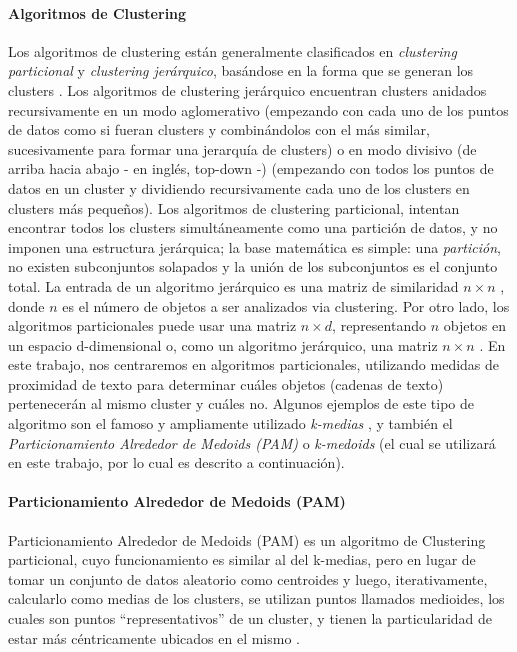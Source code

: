 \paragraph{Algoritmos de Clustering}
Los algoritmos de clustering están generalmente clasificados en \textit{clustering particional} y \textit{clustering jerárquico}, basándose en la forma que se generan los clusters \citep{xu2008clustering}. Los algoritmos de clustering jerárquico encuentran clusters anidados recursivamente en un modo aglomerativo (empezando con cada uno de los puntos de datos como si fueran clusters y combinándolos con el más similar, sucesivamente para formar una jerarquía de clusters) o en modo divisivo (de arriba hacia abajo - en inglés, top-down -) (empezando con todos los puntos de datos en un cluster y dividiendo recursivamente cada uno de los clusters en clusters más pequeños). Los algoritmos de clustering particional, intentan encontrar todos los clusters simultáneamente como una partición de datos, y no imponen una estructura jerárquica; la base matemática es simple: una \textit{partición}, no existen subconjuntos solapados y la unión de los subconjuntos es el conjunto total. La entrada de un algoritmo jerárquico es una matriz de similaridad \(n \times n\) , donde \(n\) es el número de objetos a ser analizados via clustering. Por otro lado, los algoritmos particionales puede usar una matriz \(n \times d\), representando \(n\) objetos en un espacio d-dimensional o, como un algoritmo jerárquico, una matriz \(n \times n\) \citep{jain2010data}.
En este trabajo, nos centraremos en algoritmos particionales, utilizando medidas de proximidad de texto para determinar cuáles objetos (cadenas de texto) pertenecerán al mismo cluster y cuáles no. Algunos ejemplos de este tipo de algoritmo son el famoso y ampliamente utilizado \textit{k-medias} \citep{macqueen1967some}, y también el \textit{Particionamiento Alrededor de Medoids (PAM)} o \textit{k-medoids} (el cual se utilizará en este trabajo, por lo cual es descrito a continuación).

\paragraph{Particionamiento Alrededor de Medoids (PAM)}
Particionamiento Alrededor de Medoids (PAM) es un algoritmo de Clustering particional, cuyo funcionamiento es similar al del k-medias, pero en lugar de tomar un conjunto de datos aleatorio como centroides y luego, iterativamente, calcularlo como medias de los clusters, se utilizan puntos llamados medioides, los cuales son puntos “representativos” de un cluster, y tienen la particularidad de estar más céntricamente ubicados en el mismo \citep{rdusseeun1987clustering}.

